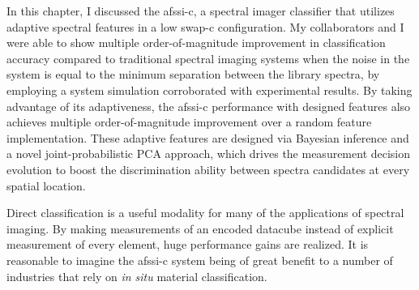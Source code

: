 In this chapter, I discussed the \acrfull{afssi-c}, a spectral imager classifier that utilizes adaptive spectral features in a low \acrfull{swap-c} configuration. My collaborators and I were able to show multiple order-of-magnitude improvement in classification accuracy compared to traditional spectral imaging systems when the noise in the system is equal to the minimum separation between the library spectra, by employing a system simulation corroborated with experimental results. By taking advantage of its adaptiveness, the \gls{afssi-c} performance with designed features also achieves multiple order-of-magnitude improvement over a random feature implementation. These adaptive features are designed via Bayesian inference and a novel joint-probabilistic PCA approach, which drives the measurement decision evolution to boost the discrimination ability between spectra candidates at every spatial location. 

Direct classification is a useful modality for many of the applications of spectral imaging. By making measurements of an encoded datacube instead of explicit measurement of every element, huge performance gains are realized. It is reasonable to imagine the \gls{afssi-c} system being of great benefit to a number of industries that rely on \textit{in situ} material classification. 